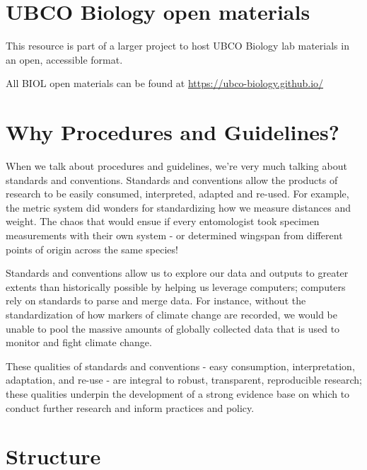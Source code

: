 \documentclass[
]{book}
\begin{document}
\hypertarget{ubco-biology-open-materials}{%
\section*{UBCO Biology open materials}\label{ubco-biology-open-materials}}

This resource is part of a larger project to host UBCO Biology lab materials in an open, accessible format.

All BIOL open materials can be found at \url{https://ubco-biology.github.io/}

\hypertarget{why-procedures-and-guidelines}{%
\section*{Why Procedures and Guidelines?}\label{why-procedures-and-guidelines}}

When we talk about procedures and guidelines, we're very much talking about standards and conventions. Standards and conventions allow the products of research to be easily consumed, interpreted, adapted and re-used. For example, the metric system did wonders for standardizing how we measure distances and weight. The chaos that would ensue if every entomologist took specimen measurements with their own system - or determined wingspan from different points of origin across the same species!

Standards and conventions allow us to explore our data and outputs to greater extents than historically possible by helping us leverage computers; computers rely on standards to parse and merge data. For instance, without the standardization of how markers of climate change are recorded, we would be unable to pool the massive amounts of globally collected data that is used to monitor and fight climate change.

These qualities of standards and conventions - easy consumption, interpretation, adaptation, and re-use - are integral to robust, transparent, reproducible research; these qualities underpin the development of a strong evidence base on which to conduct further research and inform practices and policy.

\hypertarget{structure}{%
\section*{Structure}\label{structure}}
\end{document}
